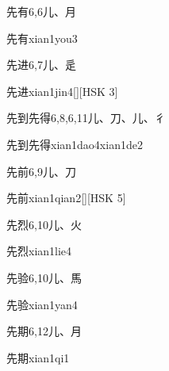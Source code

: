 \begin{entry}{先有}{6,6}{⼉、⽉}
  \begin{phonetics}{先有}{xian1you3}
  \end{phonetics}
\end{entry}

\begin{entry}{先进}{6,7}{⼉、⾡}
  \begin{phonetics}{先进}{xian1jin4}[][HSK 3]
  \end{phonetics}
\end{entry}

\begin{entry}{先到先得}{6,8,6,11}{⼉、⼑、⼉、⼻}
  \begin{phonetics}{先到先得}{xian1dao4xian1de2}
  \end{phonetics}
\end{entry}

\begin{entry}{先前}{6,9}{⼉、⼑}
  \begin{phonetics}{先前}{xian1qian2}[][HSK 5]
  \end{phonetics}
\end{entry}

\begin{entry}{先烈}{6,10}{⼉、⽕}
  \begin{phonetics}{先烈}{xian1lie4}
  \end{phonetics}
\end{entry}

\begin{entry}{先验}{6,10}{⼉、⾺}
  \begin{phonetics}{先验}{xian1yan4}
  \end{phonetics}
\end{entry}

\begin{entry}{先期}{6,12}{⼉、⽉}
  \begin{phonetics}{先期}{xian1qi1}
  \end{phonetics}
\end{entry}

